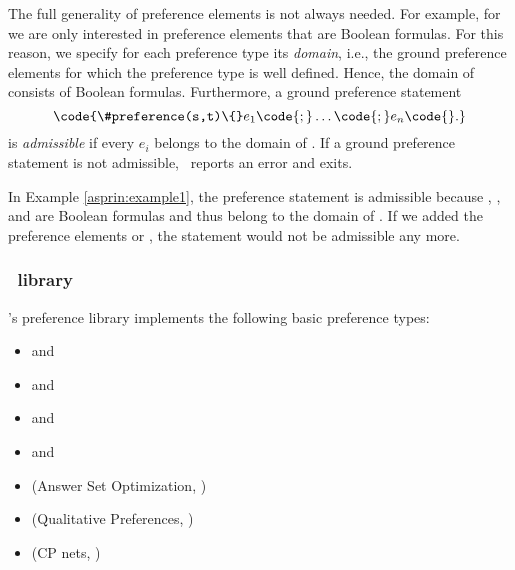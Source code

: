 The full generality of preference elements is not always needed.
%
For example, for  we are only interested in preference elements that are Boolean formulas.
For this reason, we specify for each preference type its \emph{domain}, 
i.e., the ground preference elements for which the preference type is well defined.
Hence, the domain of  consists of Boolean formulas.
Furthermore, a ground preference statement
\[\code{\#preference(s,t)\{}e_1\code{;}\dots\code{;}e_n\code{\}.}\]
is \emph{admissible} if every ${e}_i$ belongs to the domain of .
If a ground preference statement is not admissible, \asprin\ reports an error and exits. 
\begin{example}
In Example \ref{asprin:example1}, the preference statement   
is admissible because , , and  are Boolean formulas
and thus belong to the domain of . 
If we added the preference elements  or , 
the statement would not be admissible any more.
\end{example}

\subsubsection{\asprin\ library}
\asprin's preference library implements the following basic preference types:
\begin{itemize}
	\item  {} and    
	\item  {} and    
	\item  {} and    
	\item  {} and    
	\item  {}   (Answer Set Optimization, \cite{brnitr03a})
	\item  {} (Qualitative Preferences, \cite{rogima10a})
	\item  {} (CP nets, \cite{bobrdohopo04a})
\end{itemize}

